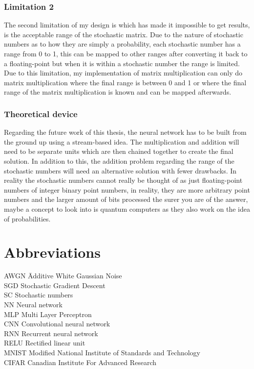 \documentclass[a4paper,oneside,phd,etd]{BYUPhys}
\begin{document}
\subsection{Limitation 2}
The second limitation of my design is which has made it impossible to get results, is the acceptable range of the stochastic matrix. Due to the nature of stochastic numbers as to how they are simply a probability, each stochastic number has a range from 0 to 1, this can be mapped to other ranges after converting it back to a floating-point but when it is within a stochastic number the range is limited. Due to this limitation, my implementation of matrix multiplication can only do matrix multiplication where the final range is between 0 and 1 or where the final range of the matrix multiplication is known and can be mapped afterwards.

\subsection{Theoretical device}
Regarding the future work of this thesis, the neural network has to be built from the ground up using a stream-based idea. The multiplication and addition will need to be separate units which are then chained together to create the final solution. In addition to this, the addition problem regarding the range of the stochastic numbers will need an alternative solution with fewer drawbacks. In reality the stochastic numbers cannot really be thought of as just floating-point numbers of integer binary point numbers, in reality, they are more arbitrary point numbers and the larger amount of bits processed the surer you are of the answer, maybe a concept to look into is quantum computers as they also work on the idea of probabilities.

\clearemptydoublepage
\chapter{Abbreviations}
\label{chap:abbreviations}

\begin{tabbing}

AWGN \qquad \qquad \= Additive White Gaussian Noise\\
SGD \> Stochastic Gradient Descent\\
SC \> Stochastic numbers\\
NN \> Neural network \\
MLP \> Multi Layer Perceptron \\
CNN \> Convolutional neural network \\
RNN \> Recurrent neural network \\
RELU \> Rectified linear unit \\
MNIST \> Modified National Institute of Standards and Technology \\
CIFAR \> Canadian Institute For Advanced Research \\
\end{tabbing}
\end{document}
